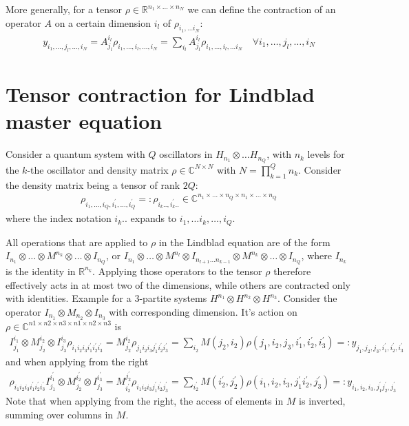 \documentclass[letterpaper]{article}
\newcommand{\R}{\mathds{R}}
\newcommand{\C}{\mathds{C}}
\begin{document}
More generally, for a tensor $\rho \in \R^{n_1\times \dots \times n_N}$ we can define the contraction of an operator $A$ on a certain dimension $i_l$ of $\rho_{i_1,\dots i_N}$:
\begin{align}
    y_{i_1,\dots,j_l,\dots,i_N} = A_{j_l}^{i_l} \rho_{i_1,\dots,i_l,\dots,i_N} = \sum_{i_l} A_{j_l}^{i_l} \rho_{i_1,\dots,i_l,\dots i_N} \quad \forall i_1,\dots, j_l,\dots,i_N
\end{align}



\section{Tensor contraction for Lindblad master equation}
Consider a quantum system with $Q$ oscillators in $H_{n_1} \otimes \dots H_{n_Q}$, with $n_k$ levels for the $k$-the oscillator and density matrix $\rho \in \C^{N\times N}$ with $N=\prod_{k=1}^{Q} n_k$. Consider the density matrix being a tensor of rank $2Q$: 
\begin{align}
    \rho_{i_1,\dots, i_Q, i_1^{\prime}, \dots, i_Q^{\prime}} =: \rho_{i_k .., i_k^\prime..}\in\C^{n_1\times \dots \times n_Q \times n_1 \times \dots \times n_Q}
\end{align}
where the index notation $i_k..$ expands to $i_1,\dots i_k, \dots,i_Q$.

All operations that are applied to $\rho$ in the Lindblad equation are of the form $I_{n_1}\otimes \dots \otimes M^{n_k} \otimes \dots \otimes I_{n_Q}$, or $I_{n_1}\otimes \dots \otimes M^{n_l} \otimes I_{n_{l+1}\dots n_{k-1}} \otimes M^{n_k} \otimes \dots \otimes I_{n_Q}$, where $I_{n_k}$ is the identity in $\R^{n_k}$. Applying those operators to the tensor $\rho$ therefore effectively acts in at most two of the dimensions, while others are contracted only with identities. Example for a 3-partite systems $H^{n_1} \otimes H^{n_2} \otimes H^{n_3}$. Consider the operator $I_{n_1} \otimes M_{n_2} \otimes I_{n_3}$ with corresponding dimension. It's action on $\rho \in \C^{n1\times n2\times n3 \times n1\times n2 \times n3}$ is
\begin{align}
    I^{i_1}_{j_1}\otimes M^{i_2}_{j_2} \otimes I^{i_3}_{j_3} \rho_{i_1i_2i_3i_1^{\prime}i_2^\prime i_3^\prime} = M^{i_2}_{j_2} \rho_{j_1i_2i_3j_1^{\prime}i_2^\prime i_3^\prime} = \sum_{i_2} M(j_2, i_2) \rho(j_1,i_2,j_3,i_1^{\prime},i_2^\prime, i_3^\prime)  =: y_{j_1,j_2,j_3,i_1^{\prime},i_2^\prime,i_3^\prime}
\end{align}
and when applying from the right
\begin{align}
    \rho_{i_1i_2i_3i_1^{\prime}i_2^\prime i_3^\prime}I^{i_1^{\prime}}_{j_1}\otimes M^{i_2^\prime}_{j_2} \otimes I^{i_3^\prime}_{j_3}  = M^{j_2^\prime}_{i_2^\prime} \rho_{i_1i_2i_3j_1^{\prime}i_2^\prime j_3^\prime} = \sum_{i_2^\prime} M(i_2^{\prime}, j_2^\prime) \rho(i_1,i_2,i_3,j_1^{\prime}i_2^\prime, j_3^\prime)  =: y_{i_1,i_2,i_3,j_1^{\prime}j_2^\prime, j_3^\prime}
\end{align}
Note that when applying from the right, the access of elements in $M$ is inverted, summing over columns in $M$.
\end{document}
